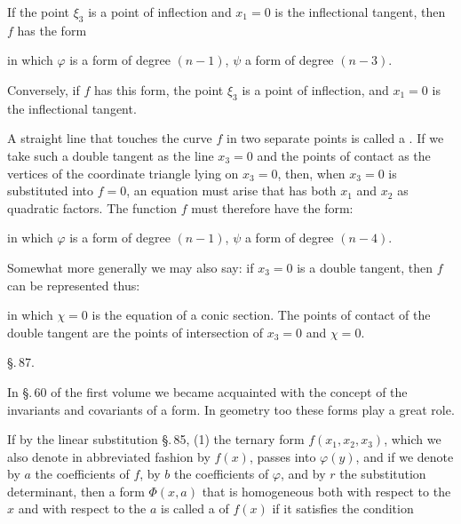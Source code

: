 If the point $\xi_3$ is a point of inflection and $x_1 = 0$ is the inflectional tangent, then $f$ has the form

in which $\varphi$ is a form of degree $(n-1)$, $\psi$ a form of degree $(n-3)$.

Conversely, if $f$ has this form, the point $\xi_3$ is a point of inflection, and $x_1 = 0$ is the inflectional tangent.

A straight line that touches the curve $f$ in two separate points is called a . If we take such a double tangent as the line $x_3 = 0$ and the points of contact as the vertices of the coordinate triangle lying on $x_3 = 0$, then, when $x_3 = 0$ is substituted into $f = 0$, an equation must arise that has both $x_1$ and $x_2$ as quadratic factors. The function $f$ must therefore have the form:

in which $\varphi$ is a form of degree $(n-1)$, $\psi$ a form of degree $(n-4)$.

Somewhat more generally we may also say: if $x_3 = 0$ is a double tangent, then $f$ can be represented thus:

in which $\chi = 0$ is the equation of a conic section. The points of contact of the double tangent are the points of intersection of $x_3 = 0$ and $\chi = 0$.

\begin{center}
\S.\,87.

\end{center}

In \S.\,60 of the first volume we became acquainted with the concept of the invariants and covariants of a form. In geometry too these forms play a great role.

If by the linear substitution \S.\,85, (1) the ternary form $f(x_1, x_2, x_3)$, which we also denote in abbreviated fashion by $f(x)$, passes into $\varphi(y)$, and if we denote by $a$ the coefficients of $f$, by $b$ the coefficients of $\varphi$, and by $r$ the substitution determinant, then a form $\Phi(x, a)$ that is homogeneous both with respect to the $x$ and with respect to the $a$ is called a  of $f(x)$ if it satisfies the condition

